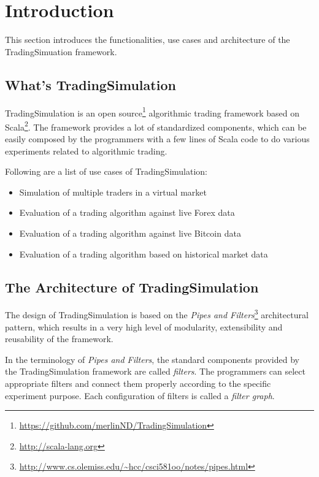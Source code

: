
\section{Introduction}
\label{sec:1}

This section introduces the functionalities, use cases and architecture of the TradingSimuation framework.

\subsection{What's TradingSimulation}

TradingSimulation is an open source\footnote{\url{https://github.com/merlinND/TradingSimulation}} algorithmic trading framework based on Scala\footnote{\url{http://scala-lang.org}}. The framework provides a lot of standardized components, which can be easily composed by the programmers with a few lines of Scala code to do various experiments related to algorithmic trading.

Following are a list of use cases of TradingSimulation:

\begin{itemize}
\item Simulation of multiple traders in a virtual market
\item Evaluation of a trading algorithm against live Forex data
\item Evaluation of a trading algorithm against live Bitcoin data
\item Evaluation of a trading algorithm based on historical market data
\end{itemize}

\subsection{The Architecture of TradingSimulation}

The design of TradingSimulation is based on the \emph{Pipes and Filters}\footnote{\url{http://www.cs.olemiss.edu/~hcc/csci581oo/notes/pipes.html}} architectural pattern, which results in a very high level of modularity, extensibility and reusability of the framework.

In the terminology of \emph{Pipes and Filters}, the standard components provided by the TradingSimulation framework are called \emph{filters}. The programmers can select appropriate filters and connect them properly according to the specific experiment purpose. Each configuration of filters is called a \emph{filter graph}.

